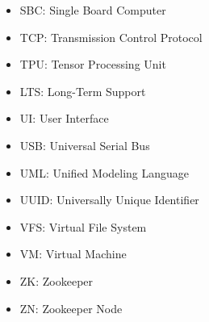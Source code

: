 \begin{itemize}
    \item SBC: Single Board Computer
    \item TCP: Transmission Control Protocol
    \item TPU: Tensor Processing Unit
    \item LTS: Long-Term Support
    \item UI: User Interface
    \item USB: Universal Serial Bus
    \item UML: Unified Modeling Language
    \item UUID: Universally Unique Identifier
    \item VFS: Virtual File System
    \item VM: Virtual Machine
    \item ZK: Zookeeper
    \item ZN: Zookeeper Node
\end{itemize}